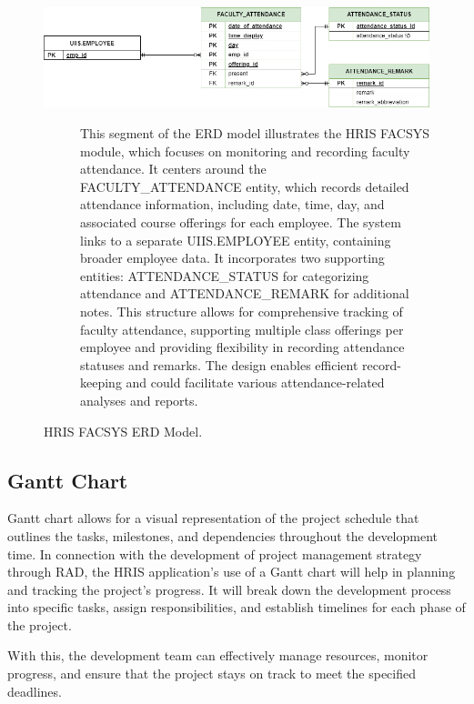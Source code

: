     \begin{figure}[H]
        \centering
        \includegraphics[width=1\linewidth]{figures/images/erd-facsys.png}
        \caption{HRIS FACSYS ERD Model.}
        \begin{description}
            \item[] This segment of the ERD model illustrates the HRIS FACSYS module, which focuses on monitoring and recording faculty attendance. It centers around the FACULTY\_ATTENDANCE entity, which records detailed attendance information, including date, time, day, and associated course offerings for each employee. The system links to a separate UIIS.EMPLOYEE entity, containing broader employee data. It incorporates two supporting entities: ATTENDANCE\_STATUS for categorizing attendance and ATTENDANCE\_REMARK for additional notes. This structure allows for comprehensive tracking of faculty attendance, supporting multiple class offerings per employee and providing flexibility in recording attendance statuses and remarks. The design enables efficient record-keeping and could facilitate various attendance-related analyses and reports.
        \end{description}
        \label{fig:erd-facsys}
    \end{figure}
    
    \subsection{Gantt Chart}
    
    Gantt chart allows for a visual representation of the project schedule that outlines the tasks, milestones, and dependencies throughout the development time. In connection with the development of project management strategy through RAD, the HRIS application's use of a Gantt chart will help in planning and tracking the project's progress. It will break down the development process into specific tasks, assign responsibilities, and establish timelines for each phase of the project.
    
    With this, the development team can effectively manage resources, monitor progress, and ensure that the project stays on track to meet the specified deadlines.

